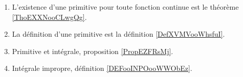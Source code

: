 
\begin{enumerate}
    \item
        L'existence d'une primitive pour toute fonction continue est le théorème \ref{ThoEXXNooCLwgQg}.
    \item
        La définition d'une primitive est la définition \ref{DefXVMVooWhsfuI}.
    \item
        Primitive et intégrale, proposition \ref{PropEZFRsMj}.
    \item
        Intégrale impropre, définition \ref{DEFooINPOooWWObEz}.
\end{enumerate}

